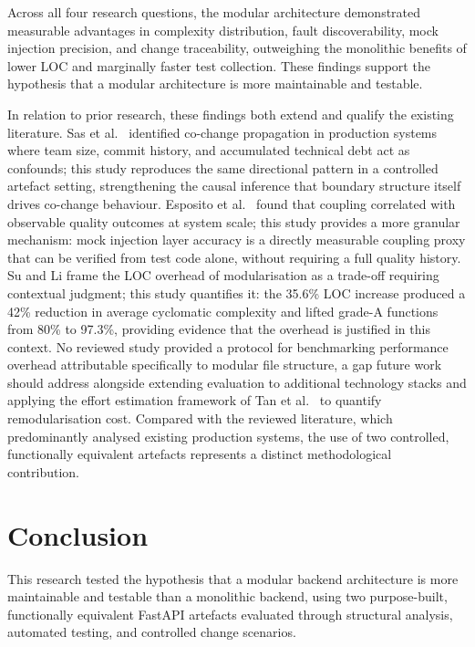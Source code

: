 \documentclass[conference]{IEEEtran}
\begin{document}
Across all four research questions, the modular architecture demonstrated measurable advantages in complexity distribution, fault discoverability, mock injection precision, and change traceability, outweighing the monolithic benefits of lower LOC and marginally faster test collection. These findings support the hypothesis that a modular architecture is more maintainable and testable.

In relation to prior research, these findings both extend and qualify the existing literature. Sas et al.\ \cite{b3} identified co-change propagation in production systems where team size, commit history, and accumulated technical debt act as confounds; this study reproduces the same directional pattern in a controlled artefact setting, strengthening the causal inference that boundary structure itself drives co-change behaviour. Esposito et al.\ \cite{b6} found that coupling correlated with observable quality outcomes at system scale; this study provides a more granular mechanism: mock injection layer accuracy is a directly measurable coupling proxy that can be verified from test code alone, without requiring a full quality history. Su and Li \cite{b5} frame the LOC overhead of modularisation as a trade-off requiring contextual judgment; this study quantifies it: the 35.6\% LOC increase produced a 42\% reduction in average cyclomatic complexity and lifted grade-A functions from 80\% to 97.3\%, providing evidence that the overhead is justified in this context. No reviewed study provided a protocol for benchmarking performance overhead attributable specifically to modular file structure, a gap future work should address alongside extending evaluation to additional technology stacks and applying the effort estimation framework of Tan et al.\ \cite{b2} to quantify remodularisation cost. Compared with the reviewed literature, which predominantly analysed existing production systems, the use of two controlled, functionally equivalent artefacts represents a distinct methodological contribution.

\section{Conclusion}

This research tested the hypothesis that a modular backend architecture is more maintainable and testable than a monolithic backend, using two purpose-built, functionally equivalent FastAPI artefacts evaluated through structural analysis, automated testing, and controlled change scenarios.
\end{document}
